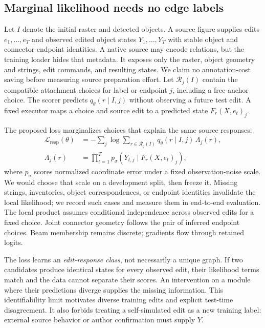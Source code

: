 \documentclass{article}
\begin{document}
\subsection{Marginal likelihood needs no edge labels}
Let $I$ denote the initial raster and detected objects. A source figure supplies edits $e_1,\ldots,e_T$ and observed edited object states $Y_1,\ldots,Y_T$ with stable object and connector-endpoint identities. A native source may encode relations, but the training loader hides that metadata. It exposes only the raster, object geometry and strings, edit commands, and resulting states. We claim no annotation-cost saving before measuring source preparation effort. Let $\mathcal R_j(I)$ contain the compatible attachment choices for label or endpoint $j$, including a free-anchor choice. The scorer predicts $q_\theta(r\mid I,j)$ without observing a future test edit. A fixed executor maps a choice and source edit to a predicted state $F_r(X,e_t)_j$.

The proposed loss marginalizes choices that explain the same source responses:
\begin{align}
\mathcal L_{\mathrm{resp}}(\theta)
 &=-\sum_j\log\sum_{r\in\mathcal R_j(I)}
 q_\theta(r\mid I,j)\,\Lambda_j(r),
\label{eq:response-loss}\\
\Lambda_j(r)
 &=\prod_{t=1}^{T}p_\sigma\left(Y_{t,j}\mid F_r(X,e_t)_j\right),
\end{align}
where $p_\sigma$ scores normalized coordinate error under a fixed observation-noise scale. We would choose that scale on a development split, then freeze it. Missing strings, inventories, object correspondences, or endpoint identities invalidate the local likelihood; we record such cases and measure them in end-to-end evaluation. The local product assumes conditional independence across observed edits for a fixed choice. Joint connector geometry follows the pair of inferred endpoint choices. Beam membership remains discrete; gradients flow through retained logits.

The loss learns an \emph{edit-response class}, not necessarily a unique graph. If two candidates produce identical states for every observed edit, their likelihood terms match and the data cannot separate their scores. An intervention on a module where their predictions diverge supplies the missing information. This identifiability limit motivates diverse training edits and explicit test-time disagreement. It also forbids treating a self-simulated edit as a new training label: external source behavior or author confirmation must supply $Y$.
\end{document}
